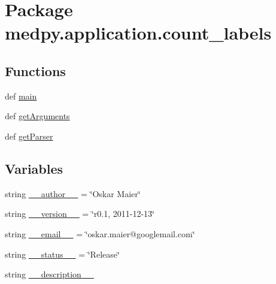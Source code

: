 \hypertarget{namespacemedpy_1_1application_1_1count__labels}{
\section{Package medpy.application.count\_\-labels}
\label{namespacemedpy_1_1application_1_1count__labels}
}
\subsection*{Functions}
\begin{DoxyCompactItemize}
\item 
def \hyperlink{namespacemedpy_1_1application_1_1count__labels_ad0983a39f76580a3d43ebf377294c1f4}{main}
\item 
def \hyperlink{namespacemedpy_1_1application_1_1count__labels_aac890535dc5d801931cb7cf03a74e2f0}{getArguments}
\item 
def \hyperlink{namespacemedpy_1_1application_1_1count__labels_a5af248332ced9cef7ec6073030d781d1}{getParser}
\end{DoxyCompactItemize}
\subsection*{Variables}
\begin{DoxyCompactItemize}
\item 
string \hyperlink{namespacemedpy_1_1application_1_1count__labels_acb138afc7f8cfbad4f6a0f47f865cafd}{\_\-\_\-author\_\-\_\-} = \char`\"{}Oskar Maier\char`\"{}
\item 
string \hyperlink{namespacemedpy_1_1application_1_1count__labels_a09bc492b1090d02ee2fc62870d49b0f2}{\_\-\_\-version\_\-\_\-} = \char`\"{}r0.1, 2011-\/12-\/13\char`\"{}
\item 
string \hyperlink{namespacemedpy_1_1application_1_1count__labels_a3f67858472a5f67fe648e469b7b718fa}{\_\-\_\-email\_\-\_\-} = \char`\"{}oskar.maier@googlemail.com\char`\"{}
\item 
string \hyperlink{namespacemedpy_1_1application_1_1count__labels_adcf28b65bcd5edac3155837669fd1708}{\_\-\_\-status\_\-\_\-} = \char`\"{}Release\char`\"{}
\item 
string \hyperlink{namespacemedpy_1_1application_1_1count__labels_aec87be74fa8ec20a1d75bbe4ce65f0b6}{\_\-\_\-description\_\-\_\-}
\end{DoxyCompactItemize}


